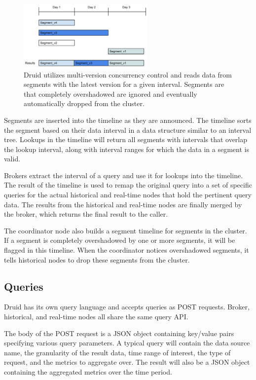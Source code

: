 \documentclass{vldb}
\begin{document}
{\begin{figure}
\centering
\includegraphics[width = 2.6in]{timeline}
\caption{
Druid utilizes multi-version concurrency control and reads data from segments
with the latest version for a given interval. Segments are that completely
overshadowed are ignored and eventually automatically dropped from the cluster.
}
\label{fig:timeline}
\end{figure}

Segments are inserted into the timeline as they are announced. The timeline
sorts the segment based on their data interval in a data structure similar to
an interval tree. Lookups in the timeline will return all segments with
intervals that overlap the lookup interval, along with interval ranges for
which the data in a segment is valid. 

Brokers extract the interval of a query and use it for lookups into the
timeline. The result of the timeline is used to remap the original query into a
set of specific queries for the actual historical and real-time nodes that hold
the pertinent query data. The results from the historical and real-time nodes
are finally merged by the broker, which returns the final result to the caller.

The coordinator node also builds a segment timeline for segments in the
cluster. If a segment is completely overshadowed by one or more segments, it
will be flagged in this timeline. When the coordinator notices overshadowed
segments, it tells historical nodes to drop these segments from the cluster.

\subsection{Queries}
Druid has its own query language and accepts queries as POST requests. Broker,
historical, and real-time nodes all share the same query API. 

The body of the POST request is a JSON object containing key/value pairs
specifying various query parameters. A typical query will contain the data
source name, the granularity of the result data, time range of interest, the
type of request, and the metrics to aggregate over. The result will also be a
JSON object containing the aggregated metrics over the time period. 

}
\end{document}

